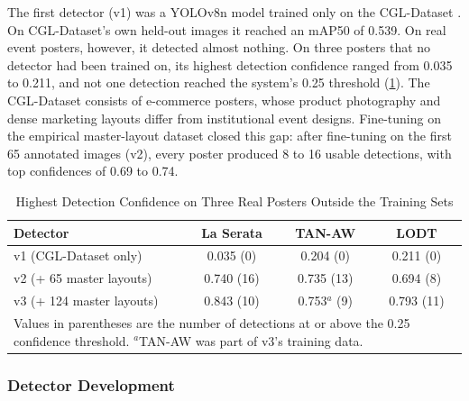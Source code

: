 \begin{refsection}
The first detector (v1) was a YOLOv8n model trained only on the CGL-Dataset \cite{zhou2022cglgan, li2023radm}. On CGL-Dataset's own held-out images it reached an mAP50 of 0.539. On real event posters, however, it detected almost nothing. On three posters that no detector had been trained on, its highest detection confidence ranged from 0.035 to 0.211, and not one detection reached the system's 0.25 threshold (\ref{tab:domain-gap}). The CGL-Dataset consists of e-commerce posters, whose product photography and dense marketing layouts differ from institutional event designs. Fine-tuning on the empirical master-layout dataset closed this gap: after fine-tuning on the first 65 annotated images (v2), every poster produced 8 to 16 usable detections, with top confidences of 0.69 to 0.74.

\begin{table}[ht]
\centering
\caption{Highest Detection Confidence on Three Real Posters Outside the Training Sets}
\label{tab:domain-gap}
\small
\begin{tabular}{l c c c}
\hline
\textbf{Detector} & \textbf{La Serata} & \textbf{TAN-AW} & \textbf{LODT} \\ \hline
v1 (CGL-Dataset only) & 0.035 (0) & 0.204 (0) & 0.211 (0) \\
v2 (+ 65 master layouts) & 0.740 (16) & 0.735 (13) & 0.694 (8) \\
v3 (+ 124 master layouts) & 0.843 (10) & 0.753$^{a}$ (9) & 0.793 (11) \\ \hline
\multicolumn{4}{p{0.80\textwidth}}{\footnotesize Values in parentheses are the number of detections at or above the 0.25 confidence threshold. $^{a}$TAN-AW was part of v3's training data.}
\end{tabular}
\end{table}

\subsubsection{Detector Development}


\end{refsection}
